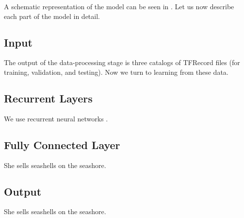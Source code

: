 

A schematic representation of the model can be seen in . Let us now
describe each part of the model in detail.

\subsection{Input}
The output of the data-processing stage is three catalogs of TFRecord files (for
training, validation, and testing). Now we turn to learning from these data.

\subsection{Recurrent Layers}
We use recurrent neural networks \cite{goodfellow2016}.

\subsection{Fully Connected Layer}
She sells seashells on the seashore.

\subsection{Output}
She sells seashells on the seashore.
